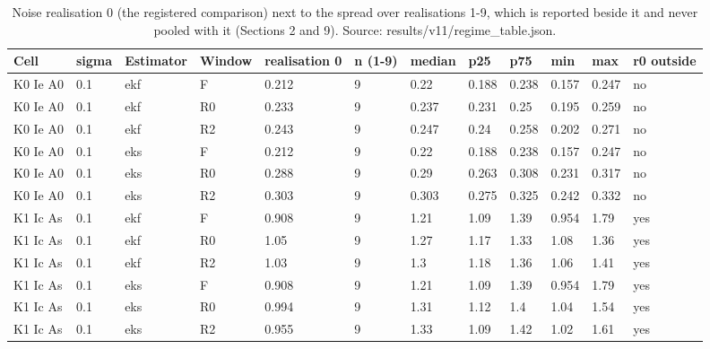 \begin{table}[t]
\centering
\caption{Noise realisation 0 (the registered comparison) next to the spread over realisations 1-9, which is reported beside it and never pooled with it (Sections 2 and 9). Source: results/v11/regime\_table.json.}
\label{tab:si-realisations}
\footnotesize
\begin{tabular}{llllllllllll}
\toprule
Cell & sigma & Estimator & Window & realisation 0 & n (1-9) & median & p25 & p75 & min & max & r0 outside \\
\midrule
K0 Ie A0 & 0.1 & ekf & F & 0.212 & 9 & 0.22 & 0.188 & 0.238 & 0.157 & 0.247 & no \\
K0 Ie A0 & 0.1 & ekf & R0 & 0.233 & 9 & 0.237 & 0.231 & 0.25 & 0.195 & 0.259 & no \\
K0 Ie A0 & 0.1 & ekf & R2 & 0.243 & 9 & 0.247 & 0.24 & 0.258 & 0.202 & 0.271 & no \\
K0 Ie A0 & 0.1 & eks & F & 0.212 & 9 & 0.22 & 0.188 & 0.238 & 0.157 & 0.247 & no \\
K0 Ie A0 & 0.1 & eks & R0 & 0.288 & 9 & 0.29 & 0.263 & 0.308 & 0.231 & 0.317 & no \\
K0 Ie A0 & 0.1 & eks & R2 & 0.303 & 9 & 0.303 & 0.275 & 0.325 & 0.242 & 0.332 & no \\
K1 Ic As & 0.1 & ekf & F & 0.908 & 9 & 1.21 & 1.09 & 1.39 & 0.954 & 1.79 & yes \\
K1 Ic As & 0.1 & ekf & R0 & 1.05 & 9 & 1.27 & 1.17 & 1.33 & 1.08 & 1.36 & yes \\
K1 Ic As & 0.1 & ekf & R2 & 1.03 & 9 & 1.3 & 1.18 & 1.36 & 1.06 & 1.41 & yes \\
K1 Ic As & 0.1 & eks & F & 0.908 & 9 & 1.21 & 1.09 & 1.39 & 0.954 & 1.79 & yes \\
K1 Ic As & 0.1 & eks & R0 & 0.994 & 9 & 1.31 & 1.12 & 1.4 & 1.04 & 1.54 & yes \\
K1 Ic As & 0.1 & eks & R2 & 0.955 & 9 & 1.33 & 1.09 & 1.42 & 1.02 & 1.61 & yes \\
\bottomrule
\end{tabular}
\end{table}
